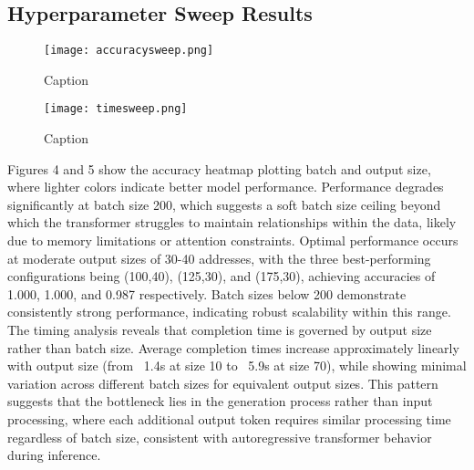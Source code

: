 \documentclass[sigconf,authorversion,nonacm]{acmart}
\begin{document}
\subsection{Hyperparameter Sweep Results}

\begin{figure}
    \centering
    \texttt{[image: accuracysweep.png]}
    \caption{Caption}
    \label{fig:placeholder}
\end{figure}

\begin{figure}
    \centering
    \texttt{[image: timesweep.png]}
    \caption{Caption}
    \label{fig:placeholder}
\end{figure}
Figures 4 and 5 show the accuracy heatmap plotting batch and output size, where lighter colors indicate better model performance. Performance degrades significantly at batch size 200, which suggests a soft batch size ceiling beyond which the transformer struggles to maintain relationships within the data, likely due to memory limitations or attention constraints.
Optimal performance occurs at moderate output sizes of 30-40 addresses, with the three best-performing configurations being (100,40), (125,30), and (175,30), achieving accuracies of 1.000, 1.000, and 0.987 respectively. Batch sizes below 200 demonstrate consistently strong performance, indicating robust scalability within this range.
The timing analysis reveals that completion time is governed by output size rather than batch size. Average completion times increase approximately linearly with output size (from ~1.4s at size 10 to ~5.9s at size 70), while showing minimal variation across different batch sizes for equivalent output sizes. This pattern suggests that the bottleneck lies in the generation process rather than input processing, where each additional output token requires similar processing time regardless of batch size, consistent with autoregressive transformer behavior during inference. \cite{sheebaelhamd2025quantization}

\end{document}
